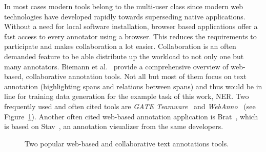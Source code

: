   In most cases modern tools belong to the multi-user class since modern web technologies have developed rapidly towards superseding native applications. Without a need for local software installation, browser based applications offer a fast access to every annotator using a browser. This reduces the requirements to participate and makes collaboration a lot easier. Collaboration is an often demanded feature to be able distribute up the workload to not only one but many annotators. Biemann et al.~\cite{biemann2017collaborative} provide a comprehensive overview of web-based, collaborative annotation tools. Not all but most of them focus on text annotation (highlighting spans and relations between spans) and thus would be in line for training data generation for the example task of this work, \ac{NER}. Two frequently used and often cited tools are \textit{GATE Teamware}~\cite{bontcheva2013gate} and \textit{WebAnno}~\cite{yimam2013webanno} (see Figure~\ref{fig:annotationGateWebanno}). Another often cited web-based annotation application is Brat~\cite{stenetorp2012brat}, which is based on Stav~\cite{ananiadou2012stav}, an annotation visualizer from the same developers.

  \begin{figure}[h]
		\centering
		\qquad
		\caption{Two popular web-based and collaborative text annotations tools.}%
		\label{fig:annotationGateWebanno}%
	\end{figure}

